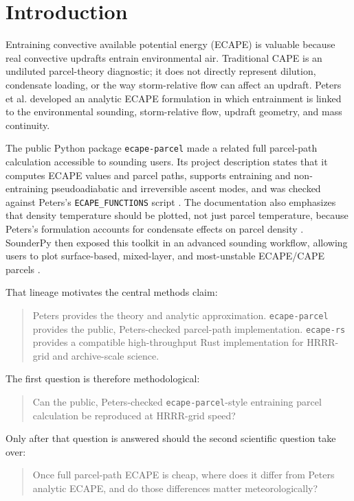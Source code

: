 \documentclass[11pt]{article}
\begin{document}
\section{Introduction}

Entraining convective available potential energy (ECAPE) is valuable because real convective updrafts entrain environmental air. Traditional CAPE is an undiluted parcel-theory diagnostic; it does not directly represent dilution, condensate loading, or the way storm-relative flow can affect an updraft. Peters et al. \cite{peters2023ecape} developed an analytic ECAPE formulation in which entrainment is linked to the environmental sounding, storm-relative flow, updraft geometry, and mass continuity.

The public Python package \texttt{ecape-parcel} made a related full parcel-path calculation accessible to sounding users. Its project description states that it computes ECAPE values and parcel paths, supports entraining and non-entraining pseudoadiabatic and irreversible ascent modes, and was checked against Peters's \texttt{ECAPE\_FUNCTIONS} script \cite{ecapeparcel}. The documentation also emphasizes that density temperature should be plotted, not just parcel temperature, because Peters's formulation accounts for condensate effects on parcel density \cite{ecapeparcel}. SounderPy then exposed this toolkit in an advanced sounding workflow, allowing users to plot surface-based, mixed-layer, and most-unstable ECAPE/CAPE parcels \cite{sounderpyparcels}.

That lineage motivates the central methods claim:

\begin{quote}
Peters provides the theory and analytic approximation. \texttt{ecape-parcel} provides the public, Peters-checked parcel-path implementation. \texttt{ecape-rs} provides a compatible high-throughput Rust implementation for HRRR-grid and archive-scale science.
\end{quote}

The first question is therefore methodological:

\begin{quote}
Can the public, Peters-checked \texttt{ecape-parcel}-style entraining parcel calculation be reproduced at HRRR-grid speed?
\end{quote}

Only after that question is answered should the second scientific question take over:

\begin{quote}
Once full parcel-path ECAPE is cheap, where does it differ from Peters analytic ECAPE, and do those differences matter meteorologically?
\end{quote}
\end{document}
